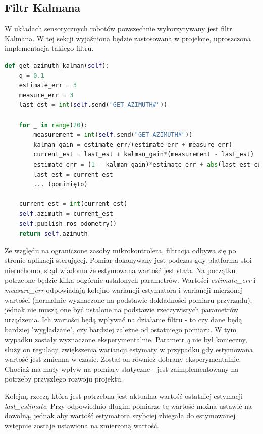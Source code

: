 \subsection{Filtr Kalmana}
W układach sensorycznych robotów powszechnie wykorzytywany jest filtr Kalmana\cite{Kedzierski2016}. W tej sekcji wyjaśniona będzie zastosowana w projekcie, uproszczona implementacja takiego filtru.

\begin{lstlisting}[basicstyle=\footnotesize\ttfamily,language=python,caption=Implementacja filtru Kalmana w języku Python,label=lst:kalman]
def get_azimuth_kalman(self):
    q = 0.1
    estimate_err = 3
    measure_err = 3
    last_est = int(self.send("GET_AZIMUTH#"))

    for _ in range(20):
        measurement = int(self.send("GET_AZIMUTH#"))
        kalman_gain = estimate_err/(estimate_err + measure_err)
        current_est = last_est + kalman_gain*(measurement - last_est)
        estimate_err = (1 - kalman_gain)*estimate_err + abs(last_est-current_est)*q
        last_est = current_est
        ... (pominięto)
        
    current_est = int(current_est)
    self.azimuth = current_est
    self.publish_ros_odometry()
    return self.azimuth
\end{lstlisting}

Ze względu na ograniczone zasoby mikrokontrolera, filtracja odbywa się po stronie aplikacji sterującej. Pomiar dokonywany jest podczas gdy platforma stoi nieruchomo, stąd wiadomo że estymowana wartość jest stała. Na początku potrzebne będzie kilka odgórnie ustalonych parametrów. Wartości \emph{estimate\_err} i \emph{measure\_err} odpowiadają kolejno wariancji estymatora i wariancji mierzonej wartości (normalnie wyznaczone na podstawie dokładności pomiaru przyrządu), jednak nie muszą one być ustalone na podstawie rzeczywistych parametrów urządzenia. Ich wartości będą wpływać na działanie filtru - to czy dane będą bardziej "wygładzane", czy bardziej zależne od ostatniego pomiaru. W tym wypadku zostały wyznaczone eksperymentalnie. Parametr \emph{q} nie był konieczny, służy on regulacji zwiększenia wariancji estymaty w przypadku gdy estymowana wartość jest zmienna w czasie. Został on również dobrany eksperymentalnie. Chociaż ma mały wpływ na pomiary statyczne - jest zaimplementowany na potrzeby przyszłego rozwoju projektu.

Kolejną rzeczą która jest potrzebna jest aktualna wartość ostatniej estymacji \emph{last\_estimate}. Przy odpowiednio długim pomiarze tę wartość można ustawić na dowolną, jednak aby wartość estymatora szybciej zbiegała do estymowanej wstępnie zostaje ustawiona na zmierzoną wartość.

